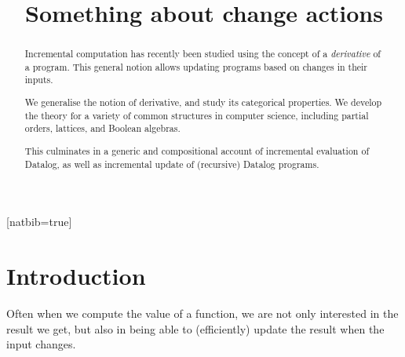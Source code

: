 
%


\usepackage[normalem]{ulem}
\usepackage[utf8]{inputenc}
\usepackage{amsmath}
\usepackage{amssymb}
\usepackage{amsthm}
\usepackage{biblatex}[natbib=true]
\usepackage{cleveref}
\usepackage{etoolbox}
\usepackage{hyperref}
\usepackage{mathtools}
\usepackage{microtype}
\usepackage{stmaryrd}
\usepackage{todonotes}

\newcommand{\todoall}[1]{\todo[inline,color=black!30,author=All]{#1}}
\newcommand{\todokcg}[1]{\todo[inline,color=pink!60,author=Katriel]{#1}}
\newcommand{\todompj}[1]{\todo[inline,color=yellow!40,author=Michael]{#1}}



\newif\ifproofs
\proofstrue





%


\begin{abstract}
  Incremental computation has recently been studied using the concept of a
  \textit{derivative} of a program. This general notion allows updating programs
  based on changes in their inputs.

  We generalise the notion of derivative, and study its categorical
  properties. We develop the theory for a variety of common structures
  in computer science, including partial orders, lattices, and Boolean algebras.

  This culminates in a generic and compositional account of incremental evaluation of Datalog, as
  well as incremental update of (recursive) Datalog programs.
\end{abstract}

\title{Something about change actions}

\maketitle

\section{Introduction}

Often when we compute the value of a function, we are not only interested in the
result we get, but also in being able to (efficiently) update the result when
the input changes.

